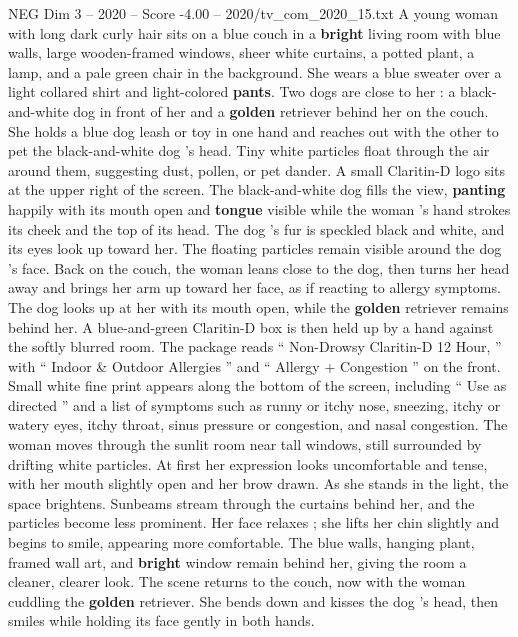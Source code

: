 \begin{textsample}{NEG Dim 3 – 2020 – Score -4.00 – 2020/tv\_com\_2020\_15.txt}  \label{ex:f3_neg_024}
A young woman with long dark curly hair sits on a blue couch in a \textbf{bright} living room with blue walls, large wooden-framed windows, sheer white curtains, a potted plant, a lamp, and a pale green chair in the background.
She wears a blue sweater over a light collared shirt and light-colored \textbf{pants}.
Two dogs are close to her : a black-and-white dog in front of her and a \textbf{golden} retriever behind her on the couch.
She holds a blue dog leash or toy in one hand and reaches out with the other to pet the black-and-white dog ’s head.
Tiny white particles float through the air around them, suggesting dust, pollen, or pet dander.
A small Claritin-D logo sits at the upper right of the screen.
The black-and-white dog fills the view, \textbf{panting} happily with its mouth open and \textbf{tongue} visible while the woman ’s hand strokes its cheek and the top of its head.
The dog ’s fur is speckled black and white, and its eyes look up toward her.
The floating particles remain visible around the dog ’s face.
Back on the couch, the woman leans close to the dog, then turns her head away and brings her arm up toward her face, as if reacting to allergy symptoms.
The dog looks up at her with its mouth open, while the \textbf{golden} retriever remains behind her.
A blue-and-green Claritin-D box is then held up by a hand against the softly blurred room.
The package reads “ Non-Drowsy Claritin-D 12 Hour, ” with “ Indoor \& Outdoor Allergies ” and “ Allergy + Congestion ” on the front.
Small white fine print appears along the bottom of the screen, including “ Use as directed ” and a list of symptoms such as runny or itchy nose, sneezing, itchy or watery eyes, itchy throat, sinus pressure or congestion, and nasal congestion.
The woman moves through the sunlit room near tall windows, still surrounded by drifting white particles.
At first her expression looks uncomfortable and tense, with her mouth slightly open and her brow drawn.
As she stands in the light, the space brightens.
Sunbeams stream through the curtains behind her, and the particles become less prominent.
Her face relaxes ; she lifts her chin slightly and begins to smile, appearing more comfortable.
The blue walls, hanging plant, framed wall art, and \textbf{bright} window remain behind her, giving the room a cleaner, clearer look.
The scene returns to the couch, now with the woman cuddling the \textbf{golden} retriever.
She bends down and kisses the dog ’s head, then smiles while holding its face gently in both hands.

\end{textsample}
